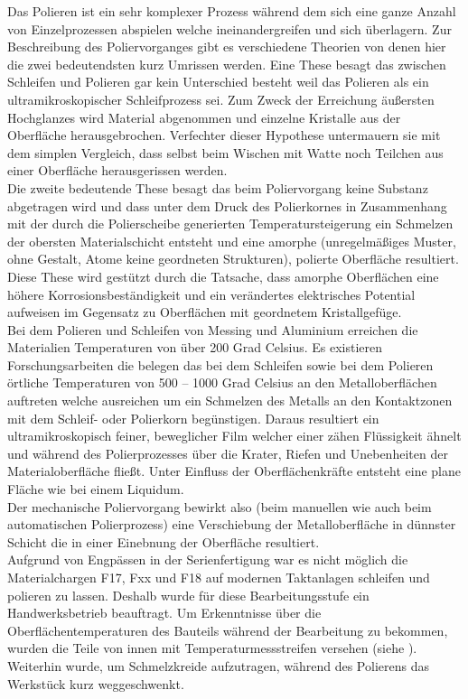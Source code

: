 \documentclass[12pt,a4paper,parskip,twoside,BCOR5mm,headsepline]{scrartcl}
\begin{document}
Das Polieren ist ein sehr komplexer Prozess während dem sich eine ganze Anzahl von Einzelprozessen abspielen welche ineinandergreifen und sich überlagern. Zur Beschreibung des Poliervorganges gibt es verschiedene Theorien von denen hier die zwei bedeutendsten kurz Umrissen werden. Eine These besagt das zwischen Schleifen und Polieren gar kein Unterschied besteht weil  das Polieren als ein ultramikroskopischer Schleifprozess sei. Zum Zweck der Erreichung  äußersten Hochglanzes wird Material abgenommen und einzelne Kristalle aus der Oberfläche herausgebrochen. Verfechter dieser Hypothese untermauern sie mit dem simplen Vergleich, dass selbst beim Wischen mit Watte noch Teilchen aus einer Oberfläche herausgerissen werden.\\ Die zweite bedeutende These besagt das beim Poliervorgang keine Substanz abgetragen wird und dass unter dem Druck des Polierkornes in Zusammenhang mit der durch die Polierscheibe generierten Temperatursteigerung ein Schmelzen der obersten Materialschicht entsteht und eine amorphe (unregelmäßiges Muster, ohne Gestalt, Atome keine geordneten Strukturen), polierte Oberfläche resultiert. Diese These wird gestützt durch die Tatsache, dass amorphe Oberflächen eine höhere Korrosionsbeständigkeit und ein verändertes elektrisches Potential aufweisen im Gegensatz zu Oberflächen mit geordnetem Kristallgefüge. \autocite[38]{hsp}\\  Bei dem Polieren und Schleifen von Messing und Aluminium erreichen die Materialien Temperaturen von über 200 Grad Celsius. Es existieren Forschungsarbeiten die belegen das bei dem Schleifen sowie bei dem Polieren örtliche Temperaturen von 500 – 1000 Grad Celsius an den Metalloberflächen auftreten welche ausreichen um ein Schmelzen des Metalls an den Kontaktzonen mit dem Schleif- oder Polierkorn begünstigen. Daraus resultiert ein ultramikroskopisch feiner, beweglicher Film welcher  einer zähen Flüssigkeit ähnelt und während des Polierprozesses über die Krater, Riefen und Unebenheiten der Materialoberfläche fließt. Unter Einfluss der Oberflächenkräfte entsteht eine plane Fläche wie bei einem Liquidum.\\ Der mechanische Poliervorgang bewirkt also (beim manuellen wie auch beim automatischen Polierprozess) eine Verschiebung der Metalloberfläche in dünnster Schicht die in einer Einebnung der Oberfläche resultiert. \autocite[40-41]{hsp} \\
Aufgrund von Engpässen in der Serienfertigung war es nicht möglich die Materialchargen F17, Fxx und F18 auf modernen Taktanlagen schleifen und polieren zu lassen. Deshalb wurde für diese Bearbeitungsstufe ein Handwerksbetrieb beauftragt. Um Erkenntnisse über die Oberflächentemperaturen des Bauteils während der Bearbeitung zu bekommen, wurden die Teile von innen mit Temperaturmessstreifen versehen (siehe ). Weiterhin wurde, um Schmelzkreide aufzutragen, während des Polierens das Werkstück kurz weggeschwenkt.
\end{document}
